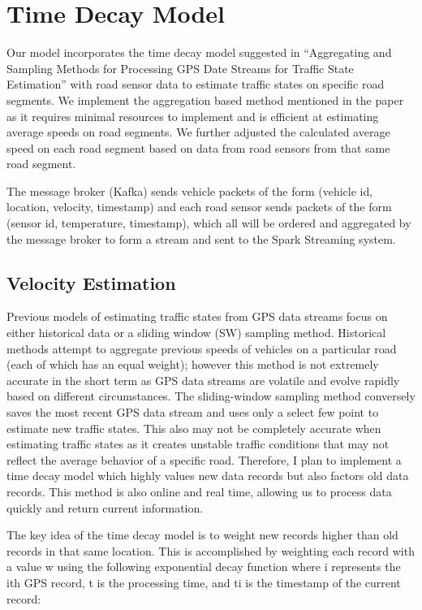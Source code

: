 \documentclass{vldb}
\begin{document}
\section{Time Decay Model}
Our model incorporates the time decay model suggested in “Aggregating and Sampling Methods for Processing GPS Date Streams for Traffic State Estimation” with road sensor data to estimate traffic states on specific road segments. We implement the aggregation based method mentioned in the paper as it requires minimal resources to implement and is efficient at estimating average speeds on road segments. We further adjusted the calculated average speed on each road segment based on data from road sensors from that same road segment. 

The message broker (Kafka) sends vehicle packets of the form (vehicle id, location, velocity, timestamp) and each road sensor sends packets of the form (sensor id, temperature, timestamp), which all will be ordered and aggregated by the message broker to form a stream and sent to the Spark Streaming system. 

\subsection{Velocity Estimation}
Previous models of estimating traffic states from GPS data streams focus on either historical data or a sliding window (SW) sampling method. Historical methods attempt to aggregate previous speeds of vehicles on a particular road (each of which has an equal weight); however this method is not extremely accurate in the short term as GPS data streams are volatile and evolve rapidly based on different circumstances. The sliding-window sampling method conversely saves the most recent GPS data stream and uses only a select few point to estimate new traffic states. This also may not be completely accurate when estimating traffic states as it creates unstable traffic conditions that may not reflect the average behavior of a specific road. Therefore, I plan to implement a time decay model which highly values new data records but also factors old data records. This method is also online and real time, allowing us to process data quickly and return current information. 

The key idea of the time decay model is to weight new records higher than old records in that same location. This is accomplished by weighting each record with a value w using the following exponential decay function where i represents the ith GPS record, t is the processing time, and ti is the timestamp of the current record:
\end{document}
